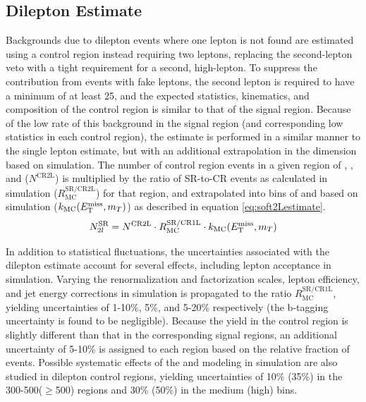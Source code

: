 \subsection{Dilepton Estimate}
\label{subsec:soft2Lestimate}
Backgrounds due to dilepton events where one lepton is not found are estimated using a control region instead requiring two leptons, replacing the second-lepton veto with a tight requirement for a second, high-\pt lepton. To suppress the contribution from events with fake leptons, the second lepton is required to have a minimum \pt of at least 25\GeV, and the expected statistics, kinematics, and composition of the control region is similar to that of the signal region. Because of the low rate of this background in the signal region (and corresponding low statistics in each control region), the estimate is performed in a similar manner to the single lepton estimate, but with an additional extrapolation in the \MET dimension based on simulation. The number of control region events in a given region of \HT, \nj, and \nb ($N^{\text{CR2L}}$) is multiplied by the ratio of SR-to-CR events as calculated in simulation ($R_{\text{MC}}^{\text{SR/CR2L}}$) for that region, and extrapolated into bins of \MET and \mt based on simulation ($k_{\text{MC}}(E_{\mathrm{T}}^{\text{miss}}, m_T)$) as described in equation \ref{eq:soft2Lestimate}. 
\begin{equation}
	N_{2l}^{\text{SR}} = N^{\text{CR2L}} \cdot R_{\text{MC}}^{\text{SR/CR1L}} \cdot k_{\text{MC}}(E_{\mathrm{T}}^{\text{miss}}, m_T)
	\label{eq:soft2Lestimate}
\end{equation}

In addition to statistical fluctuations, the uncertainties associated with the dilepton estimate account for several effects, including lepton acceptance in simulation. Varying the renormalization and factorization scales, lepton efficiency, and jet energy corrections in simulation is propagated to the ratio $R_{\text{MC}}^{\text{SR/CR1L}}$, yielding uncertainties of 1-10\%, 5\%, and 5-20\% respectively (the b-tagging uncertainty is found to be negligible). Because the \zll yield in the control region is slightly different than that in the corresponding signal regions, an additional uncertainty of 5-10\% is assigned to each region based on the relative fraction of \zll events. Possible systematic effects of the \MET and \mt modeling in simulation are also studied in dilepton \ttbar control regions, yielding uncertainties of 10\% (35\%) in the 300-500\GeV ($\geq$500\GeV) \MET regions and 30\% (50\%) in the medium (high) \mt bins.


